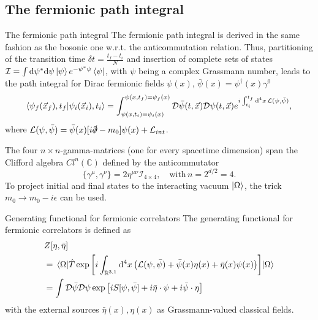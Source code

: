 \subsection{The fermionic path integral}
\begin{mybox}{The fermionic path integral}
The fermionic path integral is derived in the same fashion as the bosonic one w.r.t. the anticommutation relation. Thus, partitioning of the transition time $\delta t = \frac{t_f-t_i}{N}$ and insertion of complete sets of states $\mathcal{I} = \int \mathrm{d}\psi^* \mathrm{d} \psi \ket{\psi} e^{-\psi^* \psi } \bra{\psi}$, with $\psi$ being a complex Grassmann number, leads to the path integral for Dirac fermionic fields $\psi(x)$, $\bar{\psi}(x) = \psi^{\dagger}(x) \gamma^0$
\begin{equation}
	\braket{\psi_f(\vec{x}_f), t_f}{\psi_i(\vec{x}_i),t_i} = \int_{\psi(x,t_i)=\psi_i(x)}^{\psi(x,t_f)=\psi_f(x)} \mathcal{D}\bar{\psi}(t,\vec{x}) \mathcal{D}\psi(t,\vec{x}) e^{i \int_{t_i}^{t_f} \mathrm{d}^4 x \, \mathcal{L} (\psi, \bar{\psi})},
\end{equation}
where $\mathcal{L}(\psi,\bar{\psi})=\bar{\psi}(x) [i \slashed{\partial} - m_0] \psi(x) + \mathcal{L}_{int}$.
\end{mybox}
The four $n\times n$-gamma-matrices (one for every spacetime dimension) span the Clifford algebra $Cl^n(\mathbb{C})$ defined by the anticommutator
\begin{equation}
	\{\gamma^{\mu},\gamma^{\nu} \} = 2 \eta^{\mu \nu} \mathcal{I}_{4\times 4}, \quad \mathrm{with} \, n=2^{d/2} = 4.
\end{equation}
To project initial and final states to the interacting vacuum $\ket{\Omega}$, the trick $m_0 \rightarrow m_0 - i \epsilon$ can be used.\\
\begin{mybox}{Generating functional for fermionic correlators}
	The generating functional for fermionic correlators is defined as 
	\begin{align}
		&Z[\eta, \bar{\eta}]\\
		&= \expval{\hat{T} \exp\left[i \int_{\mathbb{R}^{3,1}} \mathrm{d}^4 x \left(\mathcal{L}(\psi,\bar{\psi}) + \bar{\psi}(x) \eta(x) + \bar{\eta}(x) \psi(x) \right)\right]}{\Omega} \\
		&= \int \mathcal{D}\bar{\psi} \mathcal{D}\psi \exp\left[i S[\psi, \bar{\psi}]+ i \bar{\eta} \cdot \psi + i \bar{\psi} \cdot \eta \right]
	\end{align}
with the external sources $\bar{\eta}(x), \eta(x)$ as Grassmann-valued classical fields.
\end{mybox}



